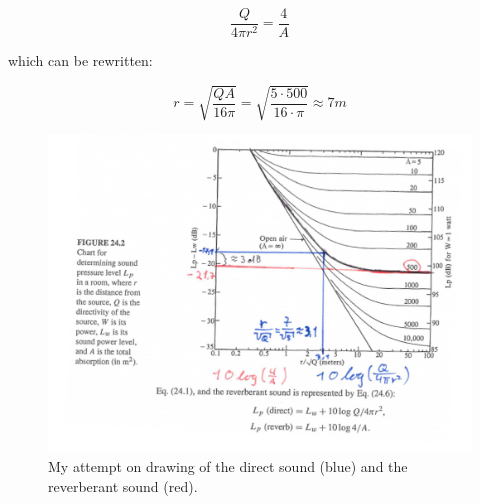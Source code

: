 \documentclass{article}
\begin{document}
\begin{equation}
    \frac{Q}{4\pi r^2} = \frac{4}{A}
\end{equation}

which can be rewritten:

\begin{equation}
 r = \sqrt{\frac{Q A}{16 \pi}} = \sqrt{\frac{5 \cdot 500}{16 \cdot \pi}} \approx 7m 
\end{equation}






\begin{figure}[H]
    \centering
    \includegraphics{figures/oving2_1_solution.png}
    \caption{My attempt on drawing of the direct sound (blue) and the reverberant sound (red).}
    \label{fig:my_label}
\end{figure}
\end{document}
